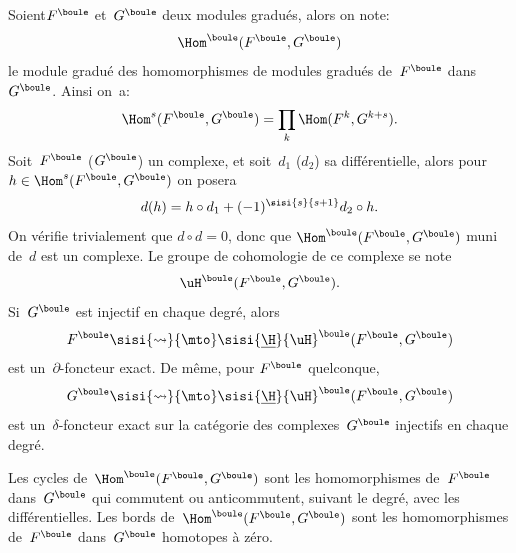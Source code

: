 \subsection{} \label{V.1.1}
Soient\pageoriginale $F^{\boule}$ et~$G^{\boule}$ deux modules gradu\'es, alors on note:
\begin{equation} \label{eq:V.1} \Hom^{\boule}(F^{\boule}, G^{\boule})
\end{equation}
le module gradu\'e des homomorphismes de modules gradu\'es de~$F^{\boule}$ dans~$G^{\boule}$. Ainsi on~a:
\begin{equation} \label{eq:V.2} \Hom^{s}(F^{\boule}, G^{\boule})=\prod_{k}\Hom(F^{k}, G^{k+s}).
\end{equation}
Soit~$F^{\boule}$ (\resp $G^{\boule}$) un complexe, et soit~$d_{1}$ (\resp $d_{2}$) sa diff\'erentielle, alors pour $h\in\Hom^{s}(F^{\boule}, G^{\boule})$ on posera
\begin{equation} \label{eq:V.3} d(h)=h\circ d_{1}+(-1)^{\sisi{s}{{s+1}}}d_{2}\circ h.
\end{equation}
On v\'erifie trivialement que $d\circ d=0$, donc que $\Hom^{\boule}(F^{\boule}, G^{\boule})$ muni de~$d$ est un complexe. Le groupe de cohomologie de ce complexe se note
\begin{equation} \label{eq:V.4} \uH^{\boule}(F^{\boule}, G^{\boule}).
\end{equation}
Si~$G^{\boule}$ est injectif en chaque degr\'e, alors
$$F^{\boule}\sisi{\rightsquigarrow}{\mto}\sisi{\underline\H}{\uH}^{\boule}(F^{\boule}, G^{\boule})$$
est un~$\partial$-foncteur exact. De m\^eme, pour $F^{\boule}$ quelconque,
$$G^{\boule}\sisi{\rightsquigarrow}{\mto}\sisi{\underline\H}{\uH}^{\boule}(F^{\boule}, G^{\boule})$$
est un~$\delta$-foncteur exact sur la cat\'egorie des complexes~$G^{\boule}$ injectifs en chaque degr\'e.

\begin{remarque} \label{V.1.2}
Les cycles de~$\Hom^{\boule}(F^{\boule}, G^{\boule})$ sont les homomorphismes de~$F^{\boule}$ dans~$G^{\boule}$ qui commutent ou anticommutent, suivant le degr\'e, avec les diff\'erentielles. Les bords de~$\Hom^{\boule}(F^{\boule}, G^{\boule})$ sont les homomorphismes de~$F^{\boule}$ dans~$G^{\boule}$ homotopes \`a z\'ero.
\end{remarque}


